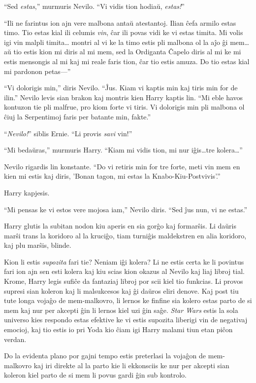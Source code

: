 ``Sed \emph{estas},'' murmuris Nevilo. ``Vi vidis tion hodiaŭ, \emph{estas!}''

``Ili ne farintus ion ajn vere malbona antaŭ atestantoj. Ilian ĉefa
armilo estas timo. Tio estas kial ili celumis \emph{vin}, ĉar ili
povas vidi ke vi estas timita. Mi volis igi vin malpli timita\ldots
montri al vi ke la timo estis pli malbona ol la aĵo ĝi mem\ldots aŭ
tio estis kion mi diris al mi mem, sed la Ordiganta Ĉapelo diris al mi
ke mi estis mensongis al mi kaj mi reale faris tion, ĉar tio estis
amuza. Do tio estas kial mi pardonon petas—''

``Vi dolorigis min,'' diris Nevilo. ``Ĵus. Kiam vi kaptis min kaj
tiris min for de ilin.'' Nevilo levis sian brakon kaj montris kien
Harry kaptis lin. ``Mi eble havos kontuzon tie pli malfrue, pro kiom
forte vi tiris. Vi dolorigis min pli malbona ol ĉiuj la Serpentimoj
faris per batante min, fakte.''

``\emph{Nevilo!}'' siblis Ernie. ``Li provis \emph{savi} vin!''

``Mi bedaŭras,'' murmuris Harry. ``Kiam mi vidis tion, mi nur iĝis\ldots tre kolera\ldots''

Nevilo rigardis lin konstante. ``Do vi retiris min for tre forte, meti
vin mem en kien mi estis kaj diris, 'Bonan tagon, mi estas la
Knabo-Kiu-Postvivis'.''

Harry kapjesis.

``Mi pensas ke vi estos vere mojosa iam,'' Nevilo diris. ``Sed ĵus
nun, vi ne estas.''

Harry glutis la subitan nodon kiu aperis en sia gorĝo kaj
formarŝis. Li daŭris marŝi trans la koridoro al la kruciĝo, tiam
turniĝis maldekstren en alia koridoro, kaj plu marŝis, blinde.

Kion li estis \emph{supozita} fari tie? Neniam iĝi kolera? Li ne estis
certa ke li povintus fari ion ajn sen esti kolera kaj kiu scias kion
okazus al Nevilo kaj liaj libroj tial. Krome, Harry legis sufiĉe da
fantaziaj libroj por scii kiel tio funkcias. Li provos supresi sian
koleron kaj li malsukcesos kaj ĝi daŭros eliri denove. Kaj post tiu
tute longa vojaĝo de mem-malkovro, li lernos ke finfine sia kolero
estas parto de si mem kaj nur per akcepti ĝin li lernos kiel uzi ĝin
saĝe. \emph{Star Wars} estis la sola universo kies respondo estas
efektive ke vi estis supozita liberigi vin de negativaj emocioj, kaj
tio estis io pri Yoda kio ĉiam igi Harry malami tiun etan piĉon
verdan.

Do la evidenta plano por gajni tempo estis preterlasi la vojaĝon de
mem-malkovro kaj iri direkte al la parto kie li ekkonsciis ke nur per
akcepti sian koleron kiel parto de si mem li povus gardi ĝin sub
kontrolo.


